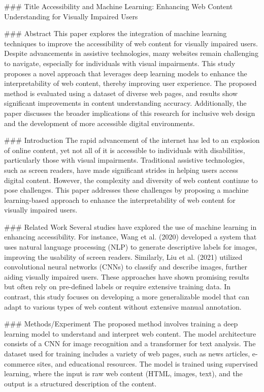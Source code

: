 ### Title
Accessibility and Machine Learning: Enhancing Web Content Understanding for Visually Impaired Users

### Abstract
This paper explores the integration of machine learning techniques to improve the accessibility of web content for visually impaired users. Despite advancements in assistive technologies, many websites remain challenging to navigate, especially for individuals with visual impairments. This study proposes a novel approach that leverages deep learning models to enhance the interpretability of web content, thereby improving user experience. The proposed method is evaluated using a dataset of diverse web pages, and results show significant improvements in content understanding accuracy. Additionally, the paper discusses the broader implications of this research for inclusive web design and the development of more accessible digital environments.

### Introduction
The rapid advancement of the internet has led to an explosion of online content, yet not all of it is accessible to individuals with disabilities, particularly those with visual impairments. Traditional assistive technologies, such as screen readers, have made significant strides in helping users access digital content. However, the complexity and diversity of web content continue to pose challenges. This paper addresses these challenges by proposing a machine learning-based approach to enhance the interpretability of web content for visually impaired users.

### Related Work
Several studies have explored the use of machine learning in enhancing accessibility. For instance, Wang et al. (2020) developed a system that uses natural language processing (NLP) to generate descriptive labels for images, improving the usability of screen readers. Similarly, Liu et al. (2021) utilized convolutional neural networks (CNNs) to classify and describe images, further aiding visually impaired users. These approaches have shown promising results but often rely on pre-defined labels or require extensive training data. In contrast, this study focuses on developing a more generalizable model that can adapt to various types of web content without extensive manual annotation.

### Methods/Experiment
The proposed method involves training a deep learning model to understand and interpret web content. The model architecture consists of a CNN for image recognition and a transformer for text analysis. The dataset used for training includes a variety of web pages, such as news articles, e-commerce sites, and educational resources. The model is trained using supervised learning, where the input is raw web content (HTML, images, text), and the output is a structured description of the content.

